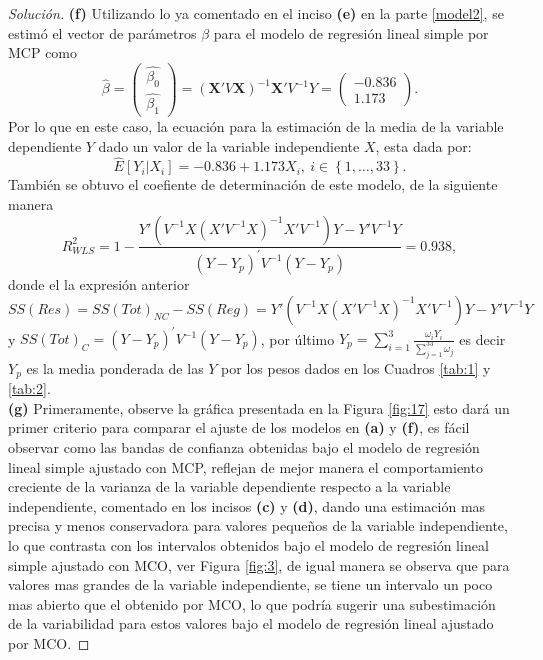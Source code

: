 \documentclass[10.5pt,notitlepage]{article}
\newenvironment{solucion}
  {\begin{proof}[Solución]}
  {\end{proof}}
\newcommand{\kis}[1]{\left\{ #1 \right\}}
\theoremstyle{plain}
\begin{document}
\begin{solucion}
\noindent\textbf{(f)} Utilizando lo ya comentado en el inciso \textbf{(e)} en la parte \eqref{model2}, se estimó el vector de parámetros \(\beta\) para el modelo de regresión lineal simple por MCP como 
\begin{equation}\label{ponde}
    \hat{\beta} = \begin{pmatrix}
    \hat{\beta_0} \\
    \hat{\beta_1}
    \end{pmatrix} = (\mathbf{X}'V\mathbf{X})^{-1}\mathbf{X}'V^{-1}Y =
    \begin{pmatrix}
    -0.836\\
     1.173 
    \end{pmatrix}.
\end{equation}
Por lo que en este caso, la ecuación para la estimación de la media de la variable dependiente \(Y\) dado un valor de la variable independiente \(X\), esta dada por: 
\begin{equation}\label{ec2}
    \hat{E}[Y_i|X_i] = -0.836 + 1.173 X_i, \ i\in\kis{1, \hdots, 33}. 
\end{equation}
También se obtuvo el coefiente de determinación de este modelo, de la siguiente manera 
\begin{equation}\label{R^222}
    R_{WLS}^{2} = 1 - \frac{Y'(V^{-1}X(X'V^{-1}X)^{-1}X'V^{-1})Y - Y'V^{-1}Y}{(Y - Y_{p})^{'}V^{-1}(Y - Y_p)} = 0.938, 
\end{equation}
donde el la expresión anterior \(SS(Res) = SS(Tot)_{NC} - SS(Reg) = Y'(V^{-1}X(X'V^{-1}X)^{-1}X'V^{-1})Y - Y'V^{-1}Y\) y \(SS(Tot)_{C} = (Y - Y_{p})^{'}V^{-1} (Y - Y_p)\), por último \(Y_p = \sum_{i=1}^{3} \frac{\omega_i Y_i}{\sum_{j=1}^{33}\omega_j}\) es decir \(Y_p\) es la media ponderada de las \(Y\) por los pesos dados en los Cuadros \ref{tab:1} y \ref{tab:2}.\\

\textbf{(g)} Primeramente, observe la gráfica presentada en la Figura \ref{fig:17} esto dará un primer criterio para comparar el ajuste de los modelos en \textbf{(a)} y \textbf{(f)}, es fácil observar como las bandas de confianza obtenidas bajo el modelo de regresión lineal simple ajustado con MCP, reflejan  de mejor manera el comportamiento creciente de la varianza de la variable dependiente respecto a la variable independiente, comentado en los incisos \textbf{(c)} y \textbf{(d)}, dando una estimación mas precisa y menos conservadora para valores pequeños de la variable independiente, lo que contrasta con los intervalos obtenidos bajo el modelo de regresión lineal simple ajustado con MCO, ver Figura \ref{fig:3}, de igual manera se observa que para valores mas grandes de la variable independiente, se tiene un intervalo un poco mas abierto que el obtenido por MCO, lo que podría sugerir una subestimación de la variabilidad para estos valores bajo el modelo de regresión lineal ajustado por MCO.


\end{solucion}
\end{document}
